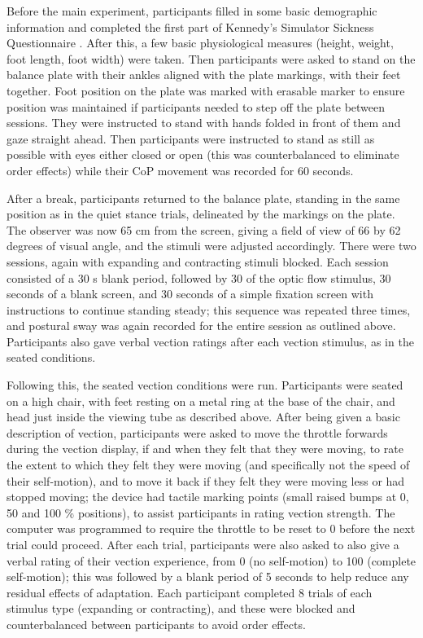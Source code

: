 \documentclass[11pt]{article}
\begin{document}
\begin{linenumbers}
Before the main experiment, participants filled in some basic demographic information and completed the first part of Kennedy's Simulator Sickness Questionnaire \cite{Kennedy:2009dt}. After this, a few basic physiological measures (height, weight, foot length, foot width) were taken. Then participants were asked to stand on the balance plate with their ankles aligned with the plate markings, with their feet together. Foot position on the plate was marked with erasable marker to ensure position was maintained if participants needed to step off the plate between sessions. They were instructed to stand with hands folded in front of them and gaze straight ahead. Then participants were instructed to stand as still as possible with eyes either closed or open (this was counterbalanced to eliminate order effects) while their CoP movement was recorded for 60 seconds.


After a break, participants returned to the balance plate, standing in the same position as in the quiet stance trials, delineated by the markings on the plate. The observer was now 65 cm from the screen, giving a field of view of 66 by 62 degrees of visual angle, and the stimuli were adjusted accordingly. There were two sessions, again with expanding and contracting stimuli blocked. Each session consisted of a 30 s blank period, followed by 30 of the optic flow stimulus, 30 seconds of a blank screen, and 30 seconds of a simple fixation screen with instructions to continue standing steady; this sequence was repeated three times, and postural sway was again recorded for the entire session as outlined above. Participants also gave verbal vection ratings after each vection stimulus, as in the seated conditions.  %

Following this, the seated vection conditions were run. Participants were seated on a high chair, with feet resting on a metal ring at the base of the chair, and head just inside the viewing tube as described above. After being given a basic description of vection, participants were asked to move the throttle forwards during the vection display, if and when they felt that they were moving, to rate the extent to which they felt they were moving (and specifically not the speed of their self-motion), and to move it back if they felt they were moving less or had stopped moving; the device had tactile marking points (small raised bumps at 0, 50 and 100 \% positions), to assist participants in rating vection strength. The computer was programmed to require the throttle to be reset to 0 before the next trial could proceed. After each trial, participants were also asked to also give a verbal rating of their vection experience, from 0 (no self-motion) to 100 (complete self-motion); this was followed by a blank period of 5 seconds to help reduce any residual effects of adaptation. Each participant completed 8 trials of each stimulus type (expanding or contracting), and these were blocked and counterbalanced between participants to avoid order effects. 


\end{linenumbers}
\end{document}
